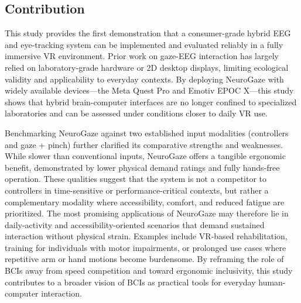 \documentclass[utf8]{FrontiersinHarvard} %
\begin{document}
\subsection{Contribution}
This study provides the first demonstration that a consumer-grade hybrid EEG and eye-tracking system can be implemented and evaluated reliably in a fully immersive VR environment. Prior work on gaze-EEG interaction has largely relied on laboratory-grade hardware or 2D desktop displays, limiting ecological validity and applicability to everyday contexts. By deploying NeuroGaze with widely available devices—the Meta Quest Pro and Emotiv EPOC X—this study shows that hybrid brain-computer interfaces are no longer confined to specialized laboratories and can be assessed under conditions closer to daily VR use.

Benchmarking NeuroGaze against two established input modalities (controllers and gaze + pinch) further clarified its comparative strengths and weaknesses. While slower than conventional inputs, NeuroGaze offers a tangible ergonomic benefit, demonstrated by lower physical demand ratings and fully hands-free operation. These qualities suggest that the system is not a competitor to controllers in time-sensitive or performance-critical contexts, but rather a complementary modality where accessibility, comfort, and reduced fatigue are prioritized.
The most promising applications of NeuroGaze may therefore lie in daily-activity and accessibility-oriented scenarios that demand sustained interaction without physical strain. Examples include VR-based rehabilitation, training for individuals with motor impairments, or prolonged use cases where repetitive arm or hand motions become burdensome. By reframing the role of BCIs away from speed competition and toward ergonomic inclusivity, this study contributes to a broader vision of BCIs as practical tools for everyday human-computer interaction.
\end{document}
